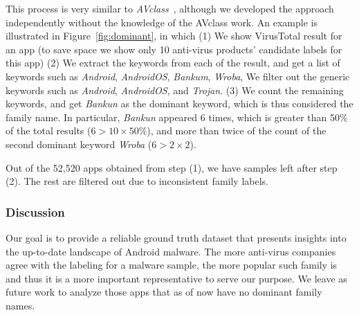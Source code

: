 This process is very similar to \emph{AVclass}~\cite{sebastian2016avclass},
although we developed the approach independently without the knowledge of
the AVclass work.
An example is illustrated in Figure~\ref{fig:dominant}, in which 
(1) We show VirusTotal result for an app (to save space
we show only 10 anti-virus products' candidate labels for this app)
(2) We extract the keywords from each of the result, and get a list of keywords such as
\emph{Android}, \emph{AndroidOS}, \emph{Bankum}, \emph{Wroba}, \etc
We filter out the generic keywords such as \emph{Android}, \emph{AndroidOS}, and \emph{Trojan}.
(3) We count the remaining keywords, and get \emph{Bankun} as the dominant keyword, 
which is thus considered the family name.
In particular, \emph{Bankun} appeared 6 times,
which is greater than 50\% of the total results ($6 > 10 \times 50\%$), and
more than twice of the count of the second dominant keyword \emph{Wroba} ($6 > 2 \times 2$).

Out of the 52,520 apps obtained from step (1), we have \samsize samples left after step (2).
The rest are filtered out due to inconsistent family labels.

\subsubsection{Discussion}

Our goal is to provide a reliable ground truth dataset that presents insights into the up-to-date landscape of Android malware. The more 
anti-virus companies agree with the labeling for a malware sample, the more popular such family is 
and thus it is a more important representative to serve our purpose.
We leave as future work to analyze those apps that as of now have no dominant family names. 

